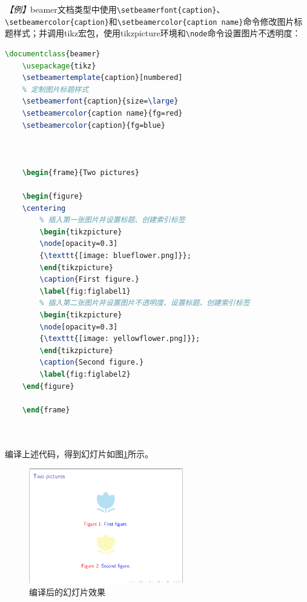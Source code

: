 \emph{【例】}beamer文档类型中使用\texttt{\textbackslash{}setbeamerfont\{caption\}}、\texttt{\textbackslash{}setbeamercolor\{caption\}}和\texttt{\textbackslash{}setbeamercolor\{caption name\}}命令修改图片标题样式；并调用tikz宏包，使用tikzpicture环境和\texttt{\textbackslash{}node}命令设置图片不透明度：
\begin{lstlisting}[language=TeX]
    \documentclass{beamer}
    \usepackage{tikz}
    \setbeamertemplate{caption}[numbered]
    % 定制图片标题样式
    \setbeamerfont{caption}{size=\large}
    \setbeamercolor{caption name}{fg=red}
    \setbeamercolor{caption}{fg=blue}

    

    \begin{frame}{Two pictures}

    \begin{figure}
    \centering
        % 插入第一张图片并设置标题、创建索引标签
        \begin{tikzpicture}
        \node[opacity=0.3]
        {\texttt{[image: blueflower.png]}};   
        \end{tikzpicture}
        \caption{First figure.}
        \label{fig:figlabel1}
        % 插入第二张图片并设置图片不透明度、设置标题、创建索引标签
        \begin{tikzpicture}
        \node[opacity=0.3]
        {\texttt{[image: yellowflower.png]}};   
        \end{tikzpicture}
        \caption{Second figure.}
        \label{fig:figlabel2}
    \end{figure}

    \end{frame}

    
\end{lstlisting}

编译上述代码，得到幻灯片如图\ref{fig:942}所示。

\begin{figure}[htbp]
    \centering
    \includegraphics[width = 0.6\textwidth]{images/ch_9/eg6_2new.png}
    \caption{编译后的幻灯片效果}
    \label{fig:942}
\end{figure}

